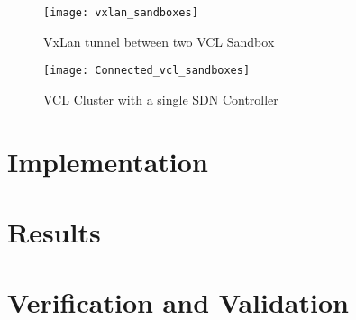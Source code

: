 \documentclass{article}
\begin{document}
\begin{figure}[H]
\centering
\texttt{[image: vxlan\_sandboxes]}
\caption{VxLan tunnel between two VCL Sandbox}
\label{fig:allvsi}
\end{figure}


\begin{figure}[H]
\centering
\texttt{[image: Connected\_vcl\_sandboxes]}
\caption{VCL Cluster with a single SDN Controller}
\label{fig:allvsi}
\end{figure}

\section{Implementation}
\section{Results}
\section{Verification and Validation}
\end{document}
